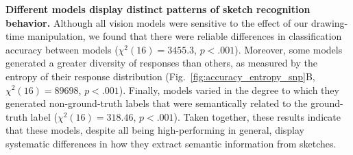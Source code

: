 \documentclass{article}
\begin{document}


\textbf{Different models display distinct patterns of sketch recognition behavior.}
Although all vision models were sensitive to the effect of our drawing-time manipulation, we found that there were reliable differences in classification accuracy between models ($\chi^2(16) = 3455.3$, $p<.001$). %
Moreover, some models generated a greater diversity of responses than others, as measured by the entropy of their response distribution (Fig.~\ref{fig:accuracy_entropy_snp}B, $\chi^2(16) = 89698$, $p<.001$). %
Finally, models varied in the degree to which they generated non-ground-truth labels that were semantically related to the ground-truth label ($\chi^2(16)=318.46$, $p<.001$). 
Taken together, these results indicate that these models, despite all being high-performing in general, display systematic differences in how they extract semantic information from sketches. 


\end{document}
